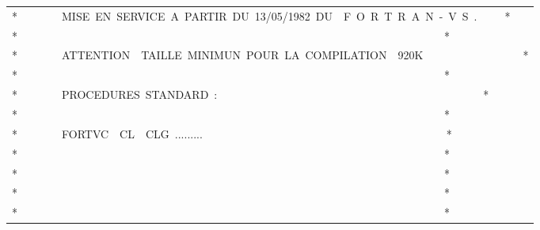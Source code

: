 {\begin{tabular}{@{}l@{}}
*~~~~~~~~MISE~EN~SERVICE~A~PARTIR~DU~13/05/1982~DU~~F~O~R~T~R~A~N~-~V~S~.~~~~~*\\
*~~~~~~~~~~~~~~~~~~~~~~~~~~~~~~~~~~~~~~~~~~~~~~~~~~~~~~~~~~~~~~~~~~~~~~~~~~~~~*\\
*~~~~~~~~ATTENTION~~TAILLE~MINIMUN~POUR~LA~COMPILATION~~920K~~~~~~~~~~~~~~~~~~*\\
*~~~~~~~~~~~~~~~~~~~~~~~~~~~~~~~~~~~~~~~~~~~~~~~~~~~~~~~~~~~~~~~~~~~~~~~~~~~~~*\\
*~~~~~~~~PROCEDURES~STANDARD~:~~~~~~~~~~~~~~~~~~~~~~~~~~~~~~~~~~~~~~~~~~~~~~~~*\\
*~~~~~~~~~~~~~~~~~~~~~~~~~~~~~~~~~~~~~~~~~~~~~~~~~~~~~~~~~~~~~~~~~~~~~~~~~~~~~*\\
*~~~~~~~~FORTVC~~CL~~CLG~.........~~~~~~~~~~~~~~~~~~~~~~~~~~~~~~~~~~~~~~~~~~~~*\\
*~~~~~~~~~~~~~~~~~~~~~~~~~~~~~~~~~~~~~~~~~~~~~~~~~~~~~~~~~~~~~~~~~~~~~~~~~~~~~*\\
*~~~~~~~~~~~~~~~~~~~~~~~~~~~~~~~~~~~~~~~~~~~~~~~~~~~~~~~~~~~~~~~~~~~~~~~~~~~~~*\\
*~~~~~~~~~~~~~~~~~~~~~~~~~~~~~~~~~~~~~~~~~~~~~~~~~~~~~~~~~~~~~~~~~~~~~~~~~~~~~*\\
*~~~~~~~~~~~~~~~~~~~~~~~~~~~~~~~~~~~~~~~~~~~~~~~~~~~~~~~~~~~~~~~~~~~~~~~~~~~~~*
\end{tabular}}

